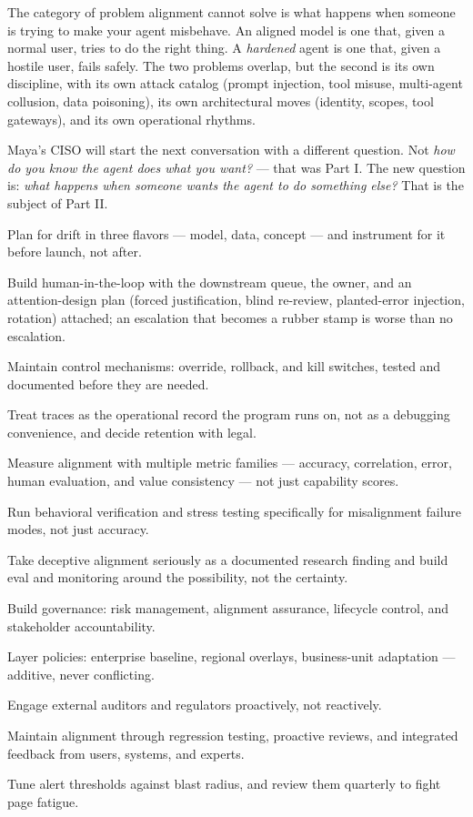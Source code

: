 The category of problem alignment cannot solve is what happens when someone is trying to make your agent misbehave. An aligned model is one that, given a normal user, tries to do the right thing. A \textit{hardened} agent is one that, given a hostile user, fails safely. The two problems overlap, but the second is its own discipline, with its own attack catalog (prompt injection, tool misuse, multi-agent collusion, data poisoning), its own architectural moves (identity, scopes, tool gateways), and its own operational rhythms.

Maya's CISO will start the next conversation with a different question. Not \textit{how do you know the agent does what you want?} --- that was Part I. The new question is: \textit{what happens when someone wants the agent to do something else?} That is the subject of Part II.

\stoptwocol

\TNrule

\begin{TNkeytakeaways}
\item Plan for drift in three flavors --- model, data, concept --- and instrument for it before launch, not after.
\item Build human-in-the-loop with the downstream queue, the owner, and an attention-design plan (forced justification, blind re-review, planted-error injection, rotation) attached; an escalation that becomes a rubber stamp is worse than no escalation.
\item Maintain control mechanisms: override, rollback, and kill switches, tested and documented before they are needed.
\item Treat traces as the operational record the program runs on, not as a debugging convenience, and decide retention with legal.
\item Measure alignment with multiple metric families --- accuracy, correlation, error, human evaluation, and value consistency --- not just capability scores.
\item Run behavioral verification and stress testing specifically for misalignment failure modes, not just accuracy.
\item Take deceptive alignment seriously as a documented research finding and build eval and monitoring around the possibility, not the certainty.
\item Build governance: risk management, alignment assurance, lifecycle control, and stakeholder accountability.
\item Layer policies: enterprise baseline, regional overlays, business-unit adaptation --- additive, never conflicting.
\item Engage external auditors and regulators proactively, not reactively.
\item Maintain alignment through regression testing, proactive reviews, and integrated feedback from users, systems, and experts.
\item Tune alert thresholds against blast radius, and review them quarterly to fight page fatigue.
\end{TNkeytakeaways}

